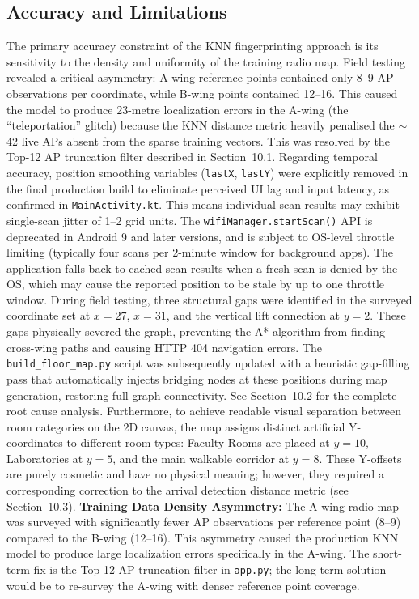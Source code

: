 \documentclass[11pt,a4paper]{article}
\begin{document}
\subsection{Accuracy and Limitations}
The primary accuracy constraint of the KNN fingerprinting approach is its sensitivity to the density and uniformity of the training radio map. Field testing revealed a critical asymmetry: A-wing reference points contained only 8--9 AP observations per coordinate, while B-wing points contained 12--16. This caused the model to produce 23-metre localization errors in the A-wing (the ``teleportation'' glitch) because the KNN distance metric heavily penalised the $\sim$42 live APs absent from the sparse training vectors. This was resolved by the Top-12 AP truncation filter described in Section~10.1.
Regarding temporal accuracy, position smoothing variables (\texttt{lastX}, \texttt{lastY}) were explicitly removed in the final production build to eliminate perceived UI lag and input latency, as confirmed in \texttt{MainActivity.kt}. This means individual scan results may exhibit single-scan jitter of 1--2 grid units.
The \texttt{wifiManager.startScan()} API is deprecated in Android 9 and later versions, and is subject to OS-level throttle limiting (typically four scans per 2-minute window for background apps). The application falls back to cached scan results when a fresh scan is denied by the OS, which may cause the reported position to be stale by up to one throttle window.
During field testing, three structural gaps were identified in the surveyed coordinate set at $x = 27$, $x = 31$, and the vertical lift connection at $y = 2$. These gaps physically severed the graph, preventing the A* algorithm from finding cross-wing paths and causing HTTP 404 navigation errors. The \texttt{build\_floor\_map.py} script was subsequently updated with a heuristic gap-filling pass that automatically injects bridging nodes at these positions during map generation, restoring full graph connectivity. See Section~10.2 for the complete root cause analysis.
Furthermore, to achieve readable visual separation between room categories on the 2D canvas, the map assigns distinct artificial Y-coordinates to different room types: Faculty Rooms are placed at $y = 10$, Laboratories at $y = 5$, and the main walkable corridor at $y = 8$. These Y-offsets are purely cosmetic and have no physical meaning; however, they required a corresponding correction to the arrival detection distance metric (see Section~10.3).
\textbf{Training Data Density Asymmetry:} The A-wing radio map was surveyed with significantly fewer AP observations per reference point (8--9) compared to the B-wing (12--16). This asymmetry caused the production KNN model to produce large localization errors specifically in the A-wing. The short-term fix is the Top-12 AP truncation filter in \texttt{app.py}; the long-term solution would be to re-survey the A-wing with denser reference point coverage.
\end{document}
